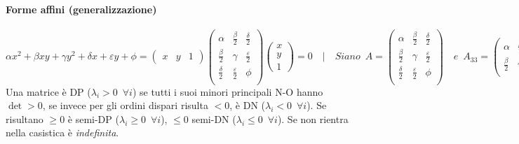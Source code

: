 \documentclass[10pt]{article}
\theoremstyle{plain}
\begin{document}
\paragraph{Forme affini (generalizzazione)}
\[\alpha x^2 + \beta x y + \gamma y^2 + \delta x + \varepsilon y + \phi = \begin{pmatrix}
    x & y & 1
\end{pmatrix} \begin{pmatrix}
    \alpha & \frac{\beta}{2} & \frac{\delta}{2}\\
    \frac{\beta}{2} & \gamma & \frac{\varepsilon}{2}\\
    \frac{\delta}{2} & \frac{\varepsilon}{2} & \phi\\
\end{pmatrix} \begin{pmatrix}
    x\\ y\\ 1
\end{pmatrix} = 0 \quad | \quad Siano \enspace A = \begin{pmatrix}
    \alpha & \frac{\beta}{2} & \frac{\delta}{2}\\
    \frac{\beta}{2} & \gamma & \frac{\varepsilon}{2}\\
    \frac{\delta}{2} & \frac{\varepsilon}{2} & \phi\\
\end{pmatrix} \quad e \enspace A_{33} = \begin{pmatrix}
    \alpha & \frac{\beta}{2}\\
    \frac{\beta}{2} & \gamma\\
\end{pmatrix}\]
Una matrice è DP ($\lambda_i > 0 \enspace \forall i$) se tutti i suoi minori principali N-O hanno $\det > 0$, se invece per gli ordini dispari risulta $< 0$, è DN ($\lambda_i < 0 \enspace \forall i$). Se risultano $\geq 0$ è semi-DP ($\lambda_i \geq 0 \enspace \forall i$), $\leq 0$ semi-DN ($\lambda_i \leq 0 \enspace \forall i$). Se non rientra nella casistica è \textit{indefinita}.
\end{document}
